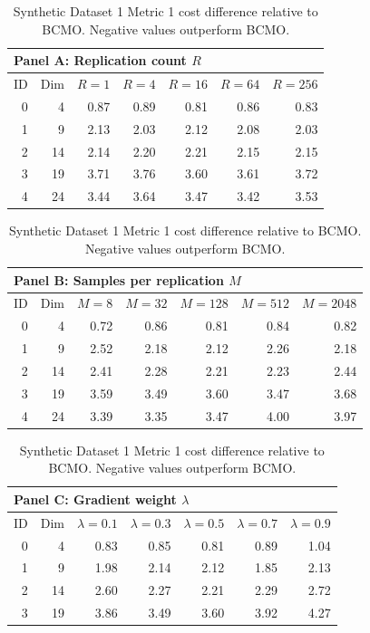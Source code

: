 \begin{table}[htbp]
\centering
\small
\setlength{\tabcolsep}{6pt}
\renewcommand{\arraystretch}{1.08}
\caption{Synthetic Dataset 1 Metric 1 cost difference relative to BCMO. Negative values outperform BCMO.}
\label{tab:synthetic_dataset_1_bcmo_difference_metric1}
\begin{tabular}{rrrrrrr}
\toprule
\multicolumn{7}{l}{\textbf{Panel A: Replication count $R$}} \\
\midrule
ID & Dim & $R=1$ & $R=4$ & $R=16$ & $R=64$ & $R=256$ \\
\midrule
0 & 4 & 0.87 & 0.89 & 0.81 & 0.86 & 0.83 \\
1 & 9 & 2.13 & 2.03 & 2.12 & 2.08 & 2.03 \\
2 & 14 & 2.14 & 2.20 & 2.21 & 2.15 & 2.15 \\
3 & 19 & 3.71 & 3.76 & 3.60 & 3.61 & 3.72 \\
4 & 24 & 3.44 & 3.64 & 3.47 & 3.42 & 3.53 \\
\bottomrule
\end{tabular}
\par\medskip
\begin{tabular}{rrrrrrr}
\toprule
\multicolumn{7}{l}{\textbf{Panel B: Samples per replication $M$}} \\
\midrule
ID & Dim & $M=8$ & $M=32$ & $M=128$ & $M=512$ & $M=2048$ \\
\midrule
0 & 4 & 0.72 & 0.86 & 0.81 & 0.84 & 0.82 \\
1 & 9 & 2.52 & 2.18 & 2.12 & 2.26 & 2.18 \\
2 & 14 & 2.41 & 2.28 & 2.21 & 2.23 & 2.44 \\
3 & 19 & 3.59 & 3.49 & 3.60 & 3.47 & 3.68 \\
4 & 24 & 3.39 & 3.35 & 3.47 & 4.00 & 3.97 \\
\bottomrule
\end{tabular}
\par\medskip
\begin{tabular}{rrrrrrr}
\toprule
\multicolumn{7}{l}{\textbf{Panel C: Gradient weight $\lambda$}} \\
\midrule
ID & Dim & $\lambda=0.1$ & $\lambda=0.3$ & $\lambda=0.5$ & $\lambda=0.7$ & $\lambda=0.9$ \\
\midrule
0 & 4 & 0.83 & 0.85 & 0.81 & 0.89 & 1.04 \\
1 & 9 & 1.98 & 2.14 & 2.12 & 1.85 & 2.13 \\
2 & 14 & 2.60 & 2.27 & 2.21 & 2.29 & 2.72 \\
3 & 19 & 3.86 & 3.49 & 3.60 & 3.92 & 4.27 \\

\end{tabular}
\end{table}
